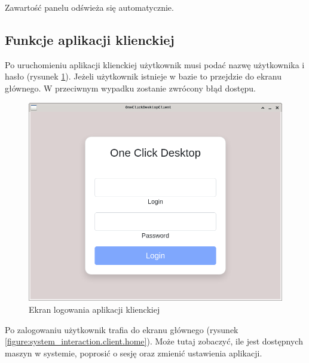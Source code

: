 \documentclass[../opis-rozwiazania.tex]{subfiles}
\begin{document}
Zawartość panelu odświeża się automatycznie.

\newpage
\subsection{Funkcje aplikacji klienckiej}

Po uruchomieniu aplikacji klienckiej użytkownik musi podać nazwę użytkownika i hasło (rysunek \ref{figure:system_interaction.client.login}).
Jeżeli użytkownik istnieje w bazie to przejdzie do ekranu głównego.
W przeciwnym wypadku zostanie zwrócony błąd dostępu.

\begin{figure}[h!]
  \centering
  \includegraphics[width=\textwidth]{resources/client_login.png}
  \caption{Ekran logowania aplikacji klienckiej}
  \label{figure:system_interaction.client.login}
\end{figure}

Po zalogowaniu użytkownik trafia do ekranu głównego (rysunek \ref{figure:system_interaction.client.home}).
Może tutaj zobaczyć, ile jest dostępnych maszyn w systemie, poprosić o sesję oraz zmienić ustawienia aplikacji.
\end{document}

